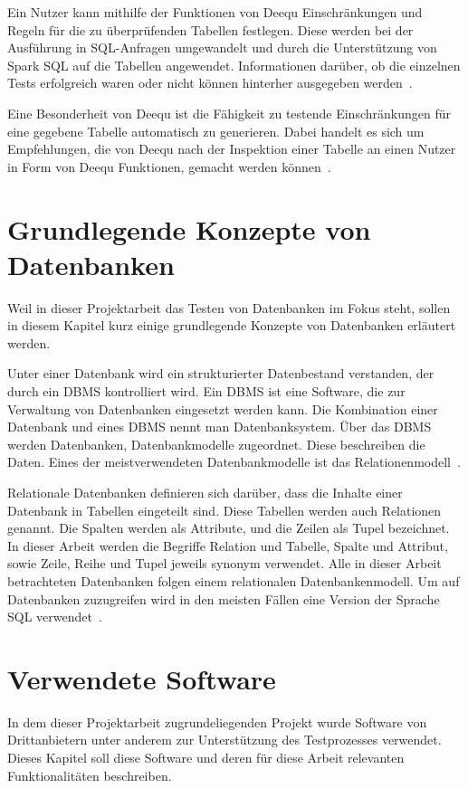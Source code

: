 Ein Nutzer kann mithilfe der Funktionen von Deequ Einschränkungen und Regeln für die zu überprüfenden Tabellen festlegen. Diese werden bei der Ausführung in \ac{SQL}-Anfragen umgewandelt und durch die Unterstützung von Spark \ac{SQL} auf die Tabellen angewendet. Informationen darüber, ob die einzelnen Tests erfolgreich waren oder nicht können hinterher ausgegeben werden~\cite{Schelter.2018}.
\newline


Eine Besonderheit von Deequ ist die Fähigkeit zu testende Einschränkungen für eine gegebene Tabelle automatisch zu generieren. Dabei handelt es sich um Empfehlungen, die von Deequ nach der Inspektion einer Tabelle an einen Nutzer in Form von Deequ Funktionen, gemacht werden können~\cite{Schelter.2018}.

\section{Grundlegende Konzepte von Datenbanken}
Weil in dieser Projektarbeit das Testen von Datenbanken im Fokus steht, sollen in diesem Kapitel kurz einige grundlegende Konzepte von Datenbanken erläutert werden.
\newline

Unter einer Datenbank wird ein strukturierter Datenbestand verstanden, der durch ein \ac{DBMS} kontrolliert wird. Ein \ac{DBMS} ist eine Software, die zur Verwaltung von Datenbanken eingesetzt werden kann. Die Kombination einer Datenbank und eines \ac{DBMS} nennt man Datenbanksystem. Über das \ac{DBMS} werden Datenbanken, Datenbankmodelle zugeordnet. Diese beschreiben die Daten. Eines der meistverwendeten Datenbankmodelle ist das Relationenmodell~\cite{Saake.2018}. 
\newline

Relationale Datenbanken definieren sich darüber, dass die Inhalte einer Datenbank in Tabellen eingeteilt sind. Diese Tabellen werden auch Relationen genannt. Die Spalten werden als Attribute, und die Zeilen als Tupel bezeichnet. In dieser Arbeit werden die Begriffe Relation und Tabelle, Spalte und Attribut, sowie Zeile, Reihe und Tupel jeweils synonym verwendet. Alle in dieser Arbeit betrachteten Datenbanken folgen einem relationalen Datenbankenmodell. Um auf Datenbanken zuzugreifen wird in den meisten Fällen eine Version der Sprache \ac{SQL} verwendet~\cite{Saake.2018}.


\section{Verwendete Software}
In dem dieser Projektarbeit zugrundeliegenden Projekt wurde Software von Drittanbietern unter anderem zur Unterstützung des Testprozesses verwendet. Dieses Kapitel soll diese Software und deren für diese Arbeit relevanten Funktionalitäten beschreiben.

